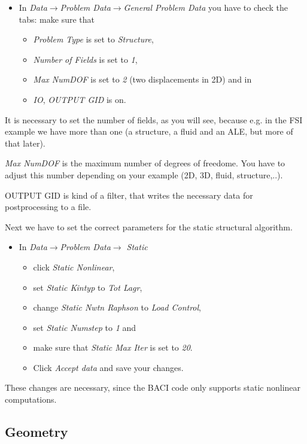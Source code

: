 \begin{itemize}
\item In \emph{Data$\to$Problem Data$\to$General Problem Data} you have
to check the tabs: make sure that 

\begin{itemize}
\item \emph{Problem Type} is set to \emph{Structure}, 
\item \emph{Number of Fields} is set to \emph{1}, 
\item \emph{Max NumDOF} is set to \emph{2} (two displacements in 2D) and
in 
\item \emph{IO}, \emph{OUTPUT GID} is on.
\end{itemize}
\end{itemize}
It is necessary to set the number of fields, as you will see, because
e.g. in the FSI example we have more than one (a structure, a fluid
and an ALE, but more of that later).

\emph{Max NumDOF} is the maximum number of degrees of freedome. You have to adjust
this number depending on your example (2D, 3D, fluid, structure,..).

OUTPUT GID is kind of a filter, that writes the necessary data for
postprocessing to a file.

Next we have to set the correct parameters for the static structural algorithm.
\begin{itemize}
\item In \emph{Data$\to$Problem Data$\to$ Static}
\begin{itemize}
\item click \emph{Static Nonlinear}, 
\item set \emph{Static Kintyp} to \emph{Tot Lagr}, 
\item change \emph{Static Nwtn Raphson} to \emph{Load Control}, 
\item set \emph{Static Numstep} to \emph{1} and
\item make sure that \emph{Static Max Iter} is set to \emph{20}.
\item Click \emph{Accept data} and save your changes.
\end{itemize}

\end{itemize}
These changes are necessary, since the BACI code only supports static nonlinear computations.

\subsection{Geometry}

